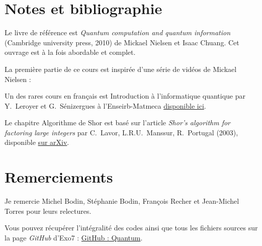 
\clearemptydoublepage
\pagestyle{empty}\thispagestyle{empty}

\vspace*{\fill}

\section*{Notes et bibliographie}

Le livre de référence est \emph{Quantum computation and quantum information} (Cambridge university press, 2010) de Mickael Nielsen et Isaac Chuang. Cet ouvrage est à la fois abordable et complet.

\medskip

La première partie de ce cours est inspirée d'une série de vidéos de Mickael Nielsen :

\medskip

Un des rares cours en français est \og{}Introduction à l'informatique quantique\fg{} par Y.~Leroyer et G.~Sénizergues
à l'Enseirb-Matmeca \href{https://dept-info.labri.fr/~ges/ENSEIGNEMENT/CALCULQ/polycop_calculq.pdf}{disponible ici}.

\medskip

Le chapitre \og{}Algorithme de Shor\fg{} est basé sur l'article \emph{Shor's algorithm for factoring large integers} par C.~Lavor, L.R.U.~Manssur, R.~Portugal (2003), disponible \href{https://arxiv.org/abs/quant-ph/0303175}{sur arXiv}.


\section*{Remerciements}

Je remercie Michel Bodin, Stéphanie Bodin, François Recher et Jean-Michel Torres pour leurs relectures.






\bigskip

\begin{center}
Vous pouvez récupérer l'intégralité des codes \Python{} ainsi que tous les fichiers sources sur la page \emph{GitHub} d'Exo7 :
\href{https://github.com/exo7math/quantum-exo7}{\og{}GitHub : Quantum\fg{}}.



\end{center}


\vspace*{\fill}

